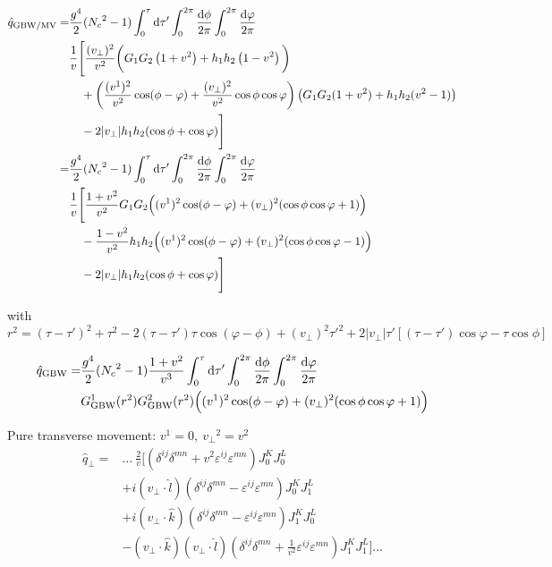 \begin{equation*}
\begin{split}
\hat{q}_{\text{GBW/MV}} = & \frac{g^4}{2}  ({N_c}^2-1) \int_0^\tau  \mathop{}\!\mathrm{d} \tau' \int_0^{2\pi} \frac{\mathop{}\!\mathrm{d} \phi}{2\pi} \int_0^{2\pi} \frac{\mathop{}\!\mathrm{d} \varphi}{2\pi} \\
 & \frac{1}{v} \Bigg[  \frac{(v_\perp)^2}{v^2} \bigg( G_1 G_2 \left(1+v^2\right) + h_1 h_2 \left( 1-v^2\right)\bigg) \\
 & ~ ~ ~ + \left(\frac{(v^1)^2}{v^2} \cos(\phi-\varphi) + \frac{(v_\perp)^2}{v^2} \cos \phi \cos \varphi \right) \left( G_1 G_2 (1+v^2) + h_1 h_2 (v^2-1) \right) \\
 & ~ ~ ~ - 2 |v_\perp| h_1 h_2 (\cos \phi + \cos \varphi ) \Bigg] \\
 = & \frac{g^4}{2}  ({N_c}^2-1) \int_0^\tau  \mathop{}\!\mathrm{d} \tau' \int_0^{2\pi} \frac{\mathop{}\!\mathrm{d} \phi}{2\pi} \int_0^{2\pi} \frac{\mathop{}\!\mathrm{d} \varphi}{2\pi} \\
 & \frac{1}{v} \Bigg[ \frac{1+v^2}{v^2} G_1 G_2  \Big( (v^1)^2 \cos(\phi-\varphi) + (v_\perp)^2 (\cos \phi \cos \varphi+1) \Big)  \\
 & ~ ~ ~ - \frac{1-v^2}{v^2} h_1 h_2 \Big( (v^1)^2 \cos (\phi-\varphi) + (v_\perp)^2 (\cos \phi \cos \varphi -1) \Big)\\
 & ~ ~ ~ - 2 |v_\perp| h_1 h_2 (\cos \phi + \cos \varphi ) \Bigg]
\end{split}
\end{equation*}

with $r^2 = (\tau-\tau')^2 + \tau^2 - 2(\tau-\tau') \tau \cos(\varphi-\phi) +  (v_\perp)^2 \tau'^2 + 2|v_\perp| \tau' \left[(\tau-\tau') \cos \varphi - \tau \cos \phi \right] $

\begin{equation}
\begin{split}
\hat{q}_{\text{GBW}} = & \frac{g^4}{2}  ({N_c}^2-1) \frac{1+v^2}{v^3} \int_0^\tau  \mathop{}\!\mathrm{d} \tau' \int_0^{2\pi} \frac{\mathop{}\!\mathrm{d} \phi}{2\pi} \int_0^{2\pi} \frac{\mathop{}\!\mathrm{d} \varphi}{2\pi} \\
 &  G^1_{\text{GBW}} (r^2) G^2_{\text{GBW}} (r^2) \Big( (v^1)^2 \cos(\phi-\varphi) + (v_\perp)^2 (\cos \phi \cos \varphi+1) \Big)
 \end{split}
\end{equation}

Pure transverse movement: $v^1 = 0, ~ {v_\perp}^2 = v^2$
\begin{equation*}
\begin{split}
\hat{q}_\perp = & ...~ \frac{2}{v} \Bigg[(\delta^{ij} \delta^{mn} + v^2 \varepsilon^{ij} \varepsilon^{mn}) J_0 ^K J_0^L \\
& + i (v_\perp \cdot \hat{l}) (\delta^{ij} \delta^{mn} - \varepsilon^{ij} \varepsilon^{mn}) J_0 ^K J_1^L \\
& + i (v_\perp \cdot \hat{k}) (\delta^{ij} \delta^{mn} - \varepsilon^{ij} \varepsilon^{mn}) J_1 ^K J_0^L \\
&-  (v_\perp \cdot \hat{k}) (v_\perp \cdot \hat{l}) \left( \delta^{ij} \delta^{mn} + \frac{1}{v^2} \varepsilon^{ij}\varepsilon^{mn} \right)  J_1 ^K J_1^L \Bigg] ...
\end{split}
\end{equation*}

